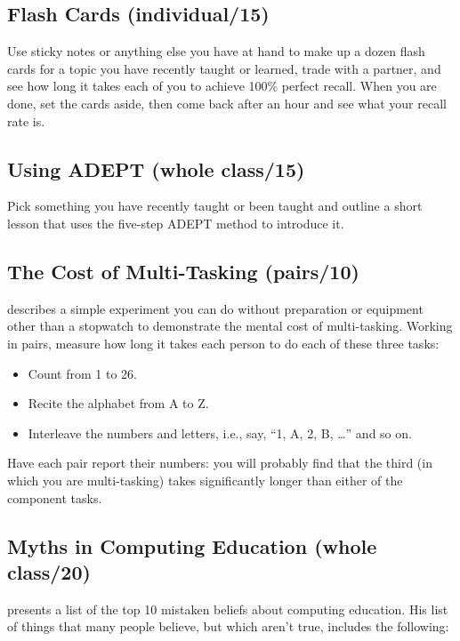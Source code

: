 \subsection*{Flash Cards (individual/15)}

Use sticky notes or anything else you have at hand to make up a dozen
flash cards for a topic you have recently taught or learned, trade with
a partner, and see how long it takes each of you to achieve 100\% perfect
recall. When you are done, set the cards aside, then come back after an
hour and see what your recall rate is.

\subsection*{Using ADEPT (whole class/15)}

Pick something you have recently taught or been taught and outline a
short lesson that uses the five-step ADEPT method to introduce it.

\subsection*{The Cost of Multi-Tasking (pairs/10)}

describes a simple experiment you can do without preparation or
equipment other than a stopwatch to demonstrate the mental cost of
multi-tasking. Working in pairs, measure how long it takes each person
to do each of these three tasks:

\begin{itemize}
\item
  Count from 1 to 26.
\item
  Recite the alphabet from A to Z.
\item
  Interleave the numbers and letters, i.e., say, ``1, A, 2, B,
  {\ldots}'' and so on.
\end{itemize}

Have each pair report their numbers: you will probably find that the
third (in which you are multi-tasking) takes significantly longer than
either of the component tasks.

\subsection*{Myths in Computing Education (whole class/20)}

\cite{Guzd2015b} presents a list of the top 10 mistaken beliefs
about computing education. His list of things that many people
believe, but which aren't true, includes the following:

